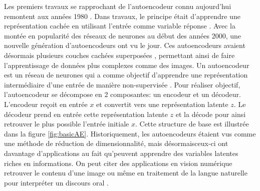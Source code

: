 Les premiers travaux se rapprochant de l'autoencodeur connu aujourd'hui remontent aux années 1980 \citep{Rumelhart-1986}. Dans \DIFdelbegin {}\DIFdelend \DIFaddbegin {}\DIFaddend travaux, le principe était d'apprendre une représentation cachée en utilisant l'entrée \DIFaddbegin {}\DIFaddend comme variable réponse \DIFaddbegin {}\DIFaddend . Avec la montée en popularité des réseaux de neurones au début des années 2000, une nouvelle génération d'autoencodeurs ont vu le jour. Ces autoencodeurs avaient désormais plusieurs couches cachées superposées \citep{HintonSalakhutdinov2006b}, permettant ainsi de faire l'apprentissage de données plus complexes comme des images. Un autoencodeur est un réseau de neurones qui a comme objectif d'apprendre une représentation intermédiaire \DIFdelbegin {}\DIFdelend d'une entrée de manière non-supervisée \citep{Goodfellow-et-al-2016}. Pour réaliser \DIFdelbegin {}\DIFdelend \DIFaddbegin {}\DIFaddend objectif, l'autoencodeur se décompose en 2 composantes: un encodeur et un décodeur. L'encodeur reçoit en entrée $x$ et convertit \DIFdelbegin {}\DIFdelend \DIFaddbegin {}\DIFaddend vers une représentation latente $z$. Le décodeur prend en entrée cette représentation latente $z$ et la décode pour ainsi retrouver \DIFaddbegin {}\DIFaddend le plus possible \DIFaddbegin {}\DIFaddend l'entrée initiale $x$. Cette structure de base est illustrée dans la figure \ref{fig:basicAE}. Historiquement, les autoencodeurs étaient vus comme une méthode de réduction de dimensionnalité, mais désormais\DIFaddbegin \DIFadd{, }\DIFaddend ceux-ci ont davantage d'applications \DIFdelbegin {}\DIFdelend \DIFaddbegin {}\DIFaddend au fait qu'\DIFdelbegin {}\DIFdelend \DIFaddbegin {}\DIFaddend peuvent apprendre des variables latentes riches en informations. On peut citer des applications en vision numérique \DIFdelbegin {}\DIFdelend \DIFaddbegin {}\DIFaddend retrouver le contenu d'une image \citep{conf/esann/KrizhevskyH11} ou même en traitement de la langue naturelle pour interpréter un discours oral \citep{inproceedings}. \newline

